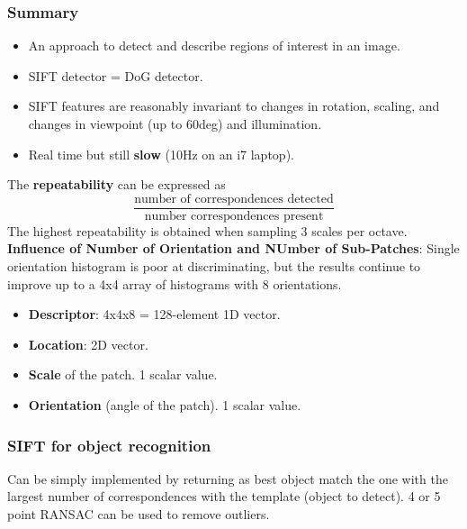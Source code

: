 \documentclass[a4paper,12 pt]{article}
\theoremstyle{definition}
\theoremstyle{remark}
\theoremstyle{definition}
\theoremstyle{definition}
\theoremstyle{definition}
\theoremstyle{remark}
\theoremstyle{definition}
\begin{document}
\subsubsection*{Summary}
\begin{itemize}
\item An approach to detect and describe regions of interest in an image.
\item SIFT detector = DoG detector.
\item SIFT features are reasonably invariant to changes in rotation, scaling, and changes in viewpoint (up to 60deg) and illumination.
\item Real time but still \textbf{slow} (10Hz on an i7 laptop).
\end{itemize}
The \textbf{repeatability} can be expressed as
\begin{equation}
\frac{\text{number of correspondences detected}}{\text{number correspondences present}}
\end{equation}
The highest repeatability is obtained when sampling 3 scales per octave.\\
\textbf{Influence of Number of Orientation and NUmber of Sub-Patches}: Single orientation histogram is poor at discriminating, but the results continue to improve up to a 4x4 array of histograms with 8 orientations. 
\begin{itemize}
\item \textbf{Descriptor}: 4x4x8 = 128-element 1D vector.
\item \textbf{Location}: 2D vector.
\item \textbf{Scale} of the patch. 1 scalar value.
\item \textbf{Orientation} (angle of the patch). 1 scalar value.
\end{itemize}
\subsubsection*{SIFT for object recognition}
Can be simply implemented by returning as best object match the one with the largest number of correspondences with the template (object to detect). 4 or 5 point RANSAC can be used to remove outliers.
\end{document}

